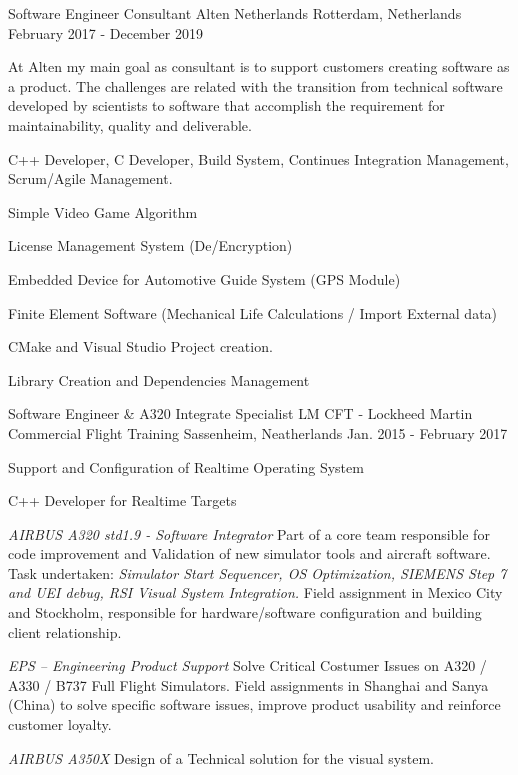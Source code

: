 \begin{cventries}
  \cventry
    {Software Engineer Consultant}
    {Alten Netherlands}
    {Rotterdam, Netherlands}
    {February 2017 - December 2019}
    {          
    At Alten my main goal as consultant is to support customers creating software as a product. The challenges are related with the transition from technical software developed by scientists  to software that accomplish the requirement for maintainability, quality and deliverable. \newline
    \begin{cvparagraph}
    \vspace{2mm}
     C++ Developer, C Developer, Build System, Continues Integration Management, Scrum/Agile Management.
    \end{cvparagraph}
    \begin{cvparagraph}
         \vspace{5 mm}
       \begin{cvitems}     
       \item Simple Video Game Algorithm
       \item License Management System (De/Encryption)
       \item Embedded Device for Automotive Guide System (GPS Module)
       \item Finite Element Software (Mechanical Life Calculations / Import External data)
       \item CMake and Visual Studio Project creation.
       \item Library Creation and Dependencies Management
       \end{cvitems}
    \end{cvparagraph}
    }
    
  \cventry
    {Software Engineer \& A320 Integrate Specialist}
    {LM CFT - Lockheed Martin Commercial Flight Training}
    {Sassenheim, Neatherlands}
    {Jan. 2015 - February 2017}
    {          
      \begin{cvitems}     
      \item{Support and Configuration of Realtime Operating System}
      \item{C++ Developer for Realtime Targets }
      \item {\textit{ AIRBUS A320 std1.9 - Software Integrator} Part of a core team responsible for code improvement and Validation of new simulator tools and aircraft software. Task undertaken: \textit{Simulator Start Sequencer, OS Optimization, SIEMENS Step 7 and  UEI debug, RSI Visual System Integration.} 
      Field assignment in Mexico City and Stockholm, responsible for hardware/software configuration and building client relationship.}
    \item {\textit{EPS – Engineering Product Support} Solve Critical Costumer  Issues on A320 / A330 / B737 Full Flight Simulators. Field assignments in Shanghai and Sanya (China) to  solve specific software issues, improve product usability and reinforce customer loyalty.}
       \item {\textit{AIRBUS A350X}  Design of a Technical solution for the visual system.}
       \end{cvitems}
    }
    

\end{cventries}
